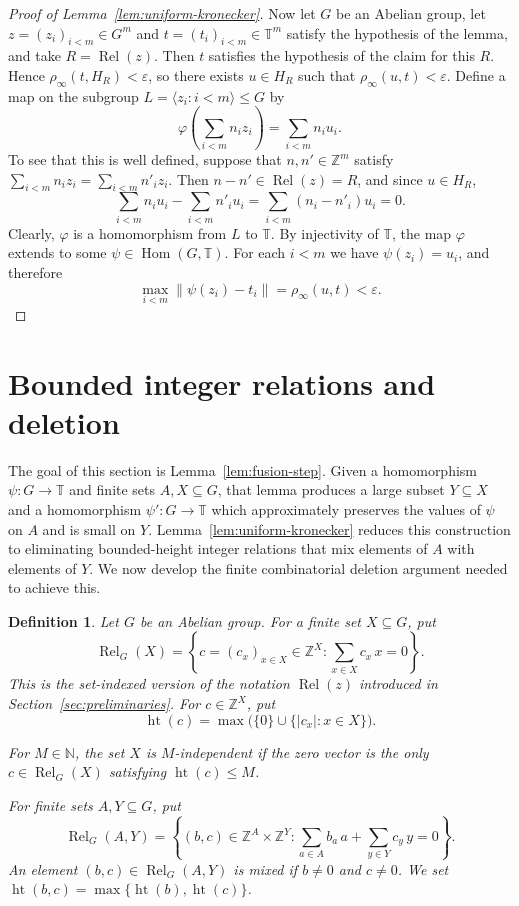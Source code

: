 \documentclass[10pt,a4paper]{amsart}
\newtheorem{definition}[theorem]{Definition}
\newcommand{\T}{\mathbb T}
\newcommand{\N}{\mathbb N}
\newcommand{\Z}{\mathbb Z}
\newcommand{\Hom}{\operatorname{Hom}}
\newcommand{\Rel}{\operatorname{Rel}}
\newcommand{\htop}{\operatorname{ht}}
\begin{document}
\begin{proof}[Proof of Lemma~\ref{lem:uniform-kronecker}]
Now let $G$ be an Abelian group, let
$z=(z_i)_{i<m}\in G^m$ and
$t=(t_i)_{i<m}\in\T^m$ satisfy the hypothesis of the lemma, and take
$R=\Rel(z)$.
Then $t$ satisfies the hypothesis of the claim for this $R$.  Hence $\rho_\infty(t,H_R)<\varepsilon$, so there
exists $u\in H_R$ such that
$\rho_\infty(u,t)<\varepsilon$.  Define a map on the subgroup
$L=\langle z_i:i<m\rangle\leq G$ by
\[
 \varphi\left(\sum_{i<m}n_i z_i\right)=\sum_{i<m}n_i u_i.
\]
To see that this is well defined, suppose that $n,n'\in\Z^m$ satisfy
$\sum_{i<m}n_i z_i=\sum_{i<m}n'_i z_i$.  Then $n-n'\in\Rel(z)=R$, and since
$u\in H_R$,
\[
 \sum_{i<m}n_i u_i-\sum_{i<m}n'_i u_i
 =\sum_{i<m}(n_i-n'_i)u_i=0.
\]
Clearly, $\varphi$ is a homomorphism from $L$ to $\T$.
By injectivity of $\T$, the map $\varphi$ extends to some
$\psi\in\Hom(G,\T)$.  For each $i<m$ we have $\psi(z_i)=u_i$, and therefore
\[
 \max_{i<m}\|\psi(z_i)-t_i\|=\rho_\infty(u,t)<\varepsilon.
\]
\end{proof}

\section{Bounded integer relations and deletion}

The goal of this section is Lemma~\ref{lem:fusion-step}.  Given a
homomorphism $\psi:G\to\T$ and finite sets $A,X\subseteq G$, that lemma
produces a large subset $Y\subseteq X$ and a homomorphism $\psi':G\to\T$
which approximately preserves the values of $\psi$ on $A$ and is small on
$Y$.  Lemma~\ref{lem:uniform-kronecker} reduces this construction to
eliminating bounded-height integer relations that mix elements of $A$ with
elements of $Y$.  We now develop the finite combinatorial deletion argument
needed to achieve this.

\begin{definition}
Let $G$ be an Abelian group.  For a finite set $X\subseteq G$, put
\[
 \Rel_G(X)=
 \left\{c=(c_x)_{x\in X}\in\Z^X:
 \sum_{x\in X}c_x\,x=0\right\}.
\]
This is the set-indexed version of the notation $\Rel(z)$ introduced in
Section~\ref{sec:preliminaries}.
For $c\in\Z^X$, put
\[
 \htop(c)=\max\bigl(\{0\}\cup\{|c_x|:x\in X\}\bigr).
\]

For $M\in\N$, the set $X$ is \emph{$M$-independent} if the zero vector is
the only $c\in\Rel_G(X)$ satisfying $\htop(c)\leq M$.

For finite sets $A,Y\subseteq G$, put
\[
 \Rel_G(A,Y)=
 \left\{(b,c)\in\Z^A\times\Z^Y:
 \sum_{a\in A}b_a\,a+\sum_{y\in Y}c_y\,y=0\right\}.
\]
An element $(b,c)\in\Rel_G(A,Y)$ is \emph{mixed} if $b\neq0$ and
$c\neq0$.  We set $\htop(b,c)=\max\{\htop(b),\htop(c)\}$.
\end{definition}
\end{document}
